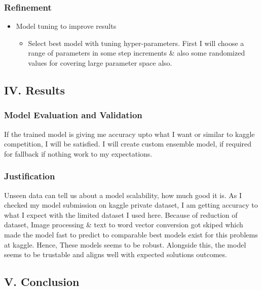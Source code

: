 \documentclass[11pt]{article}
\providecommand{\tightlist}{%
      \setlength{\itemsep}{0pt}\setlength{\parskip}{0pt}}
\begin{document}
    \subsubsection{Refinement}\label{refinement}

    \begin{itemize}
\tightlist
\item
  Model tuning to improve results

  \begin{itemize}
  \tightlist
  \item
    Select best model with tuning hyper-parameters. First I will choose
    a range of parameters in some step increments \& also some
    randomized values for covering large parameter space also.
  \end{itemize}
\end{itemize}

    \subsection{IV. Results}\label{iv.-results}

    \subsubsection{Model Evaluation and
Validation}\label{model-evaluation-and-validation}

    If the trained model is giving me accuracy upto what I want or similar
to kaggle competition, I will be satisfied. I will create custom
ensemble model, if required for fallback if nothing work to my
expectations.

    \subsubsection{Justification}\label{justification}

    Unseen data can tell us about a model scalability, how much good it is.
As I checked my model submission on kaggle private dataset, I am getting
accuracy to what I expect with the limited dataset I used here. Because
of reduction of dataset, Image processing \& text to word vector
conversion got skiped which made the model fast to predict to comparable
best models exist for this problems at kaggle. Hence, These models seems
to be robust. Alongside this, the model seems to be trustable and aligns
well with expected solutions outcomes.

    \subsection{V. Conclusion}\label{v.-conclusion}
\end{document}
